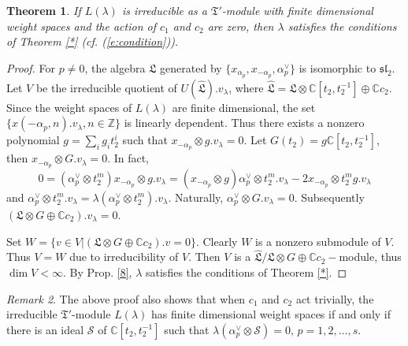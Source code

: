 \documentclass[11pt]{amsproc}
\newtheorem{theorem}{Theorem}[section]
\theoremstyle{definition}
\theoremstyle{remark}
\newtheorem{remark}[theorem]{Remark}
\numberwithin{equation}{section} \errorcontextlines=0
\begin{document}
\begin{theorem}
If $L(\lambda)$ is irreducible as a ${\mathfrak T}'$-module with
finite dimensional weight spaces and the action of $c_1$ and $c_2$
are zero, then $\lambda$ satisfies the conditions of Theorem \ref{*}
(cf. (\ref{e:condition})).
\end{theorem}
\begin{proof} For $p\neq0$, the algebra $\mathfrak{L}$ generated by
$\{x_{\alpha_p},x_{-\alpha_p},\alpha_{p}^{\vee}\}$ is isomorphic to
$\mathfrak{sl}_2$.
 Let $V$ be the irreducible quotient
of $U(\hat{\mathfrak{L}}).v_{\lambda}$, where
$\hat{\mathfrak{L}}=\mathfrak{L}\otimes\mathbb C[t_2,
t_2^{-1}]\oplus\mathbb{C}c_2$. Since the weight spaces of
$L(\lambda)$ are finite dimensional, the
set $\{x(-\alpha_p,n).v_{\lambda}, n\in\mathbb{Z}\}$ is
linearly dependent. Thus there exists a nonzero
polynomial $g=\sum\limits_i g_i t_2^i$ such that
$x_{-\alpha_p}\otimes g.v_{\lambda}=0$. Let $G(t_2)=g\mathbb C[t_2,
t_2^{-1}]$, then $x_{-\alpha_p}\otimes G.v_{\lambda}=0$. In fact,
$$0=(\alpha_{p}^{\vee}\otimes t_2^m)x_{-\alpha_p}\otimes g.v_{\lambda}=(x_{-\alpha_p}\otimes g)
\alpha_{p}^{\vee}\otimes t_2^m.v_{\lambda}-2x_{-\alpha_p}\otimes t_2^m
g.v_{\lambda}$$ and $\alpha_{p}^{\vee}\otimes
t_2^m.v_{\lambda}={\lambda}(\alpha_{p}^{\vee}\otimes t_2^m).v_{\lambda}$.
Naturally, $\alpha_{p}^{\vee}\otimes G.v_{\lambda}=0$. Subsequently $(\mathfrak{L}\otimes
G\oplus\mathbb{C}c_2).v_{\lambda}=0$.

Set $W=\{v\in V|(\mathfrak{L}\otimes
G\oplus\mathbb{C}c_2).v=0\}$. Clearly $W$ is a nonzero submodule of
$V$. Thus $V=W$ due to irreducibility of $V$. Then $V$ is a
$\hat{\mathfrak{L}}/\mathfrak{L}\otimes
G\oplus\mathbb{C}c_2-$module, thus $\dim V<\infty$. By Prop.
\ref{8}, $\lambda$ satisfies the conditions of Theorem \ref{*}.
\end{proof}

\begin{remark} The above proof also shows that when $c_1$ and $c_2$ act trivially,
the irreducible ${\mathfrak
T}'$-module $L(\lambda)$ has finite dimensional weight spaces if and
only if there is an ideal $\mathcal {S}$ of $\mathbb C[t_2,
t_2^{-1}]$ such that $\lambda(\alpha_p^{\vee}\otimes \mathcal {S})=
0$, $p=1,2,\ldots,s$.
\end{remark}
\end{document}
